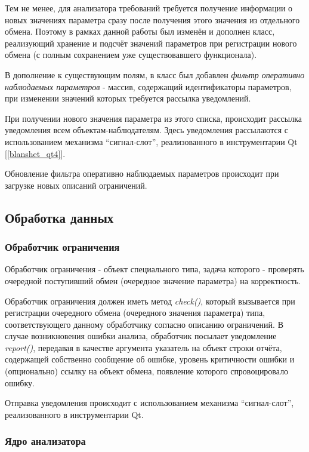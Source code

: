 Тем не менее, для анализатора требований требуется получение 
информации о новых значениях параметра сразу после получения этого значения из 
отдельного обмена. Поэтому в рамках данной работы был изменён и 
дополнен класс, реализующий хранение и подсчёт значений параметров при 
регистрации нового обмена (с полным сохранением уже существовавшего 
функционала).

В дополнение к существующим полям, в класс был добавлен \textit{фильтр 
оперативно наблюдаемых параметров} - массив, содержащий идентификаторы 
параметров, при изменении значений которых требуется рассылка уведомлений.

При получении нового значения параметра из этого списка, происходит рассылка 
уведомления всем объектам-наблюдателям. Здесь уведомления рассылаются 
с использованием механизма ``сигнал-слот'', реализованного в инструментарии Qt 
[\ref{blanshet_qt4}].

Обновление фильтра оперативно наблюдаемых параметров происходит при загрузке 
новых описаний ограничений.


\subsection{Обработка данных}

\subsubsection{Обработчик ограничения}

Обработчик ограничения - объект специального типа, задача которого - проверять 
очередной поступивший обмен (очередное значение параметра) на корректность.

Обработчик ограничения должен иметь метод \textit{check()}, который вызывается 
при регистрации очередного обмена (очередного значения параметра) типа, 
соответствующего данному обработчику согласно описанию ограничений. В случае 
возникновения ошибки анализа, обработчик посылает уведомление 
\textit{report()}, передавая в качестве аргумента указатель на объект строки 
отчёта, содержащей собственно сообщение об ошибке, уровень критичности ошибки и 
(опционально) ссылку на объект обмена, появление которого спровоцировало ошибку.

Отправка уведомления происходит с использованием механизма ``сигнал-слот'', 
реализованного в инструментарии Qt.

\subsubsection{Ядро анализатора}


